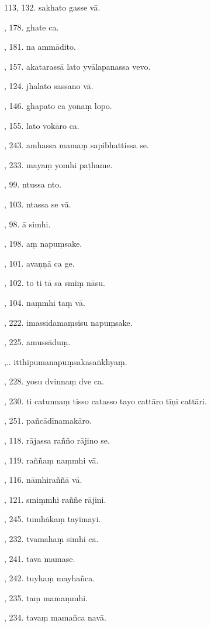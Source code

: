 113, 132. sakhato gasse vā.\par {}, 178. ghate ca.\par {}, 181. na ammādito.\par {}, 157. akatarassā lato yvālapanassa vevo.\par {}, 124. jhalato sassano vā.\par {}, 146. ghapato ca yonaṃ lopo.\par {}, 155. lato vokāro ca.\par {}, 243. amhassa mamaṃ sapibhattissa se.\par {}, 233. mayaṃ yomhi paṭhame.\par {}, 99. ntussa nto.\par {}, 103. ntassa se vā.\par {}, 98. ā simhi.\par {}, 198. aṃ napuṃsake.\par {}, 101. avaṇṇā ca ge.\par {}, 102. to ti tā sa smiṃ nāsu.\par {}, 104. naṃmhi taṃ vā.\par {}, 222. imassidamaṃsisu napuṃsake.\par {}, 225. amussāduṃ.\par {},.. itthipumanapuṃsakasaṅkhyaṃ.\par {}, 228. yosu dvinnaṃ dve ca.\par {}, 230. ti catunnaṃ tisso catasso tayo cattāro tīṇi cattāri.\par {}, 251. pañcādīnamakāro.\par {}, 118. rājassa rañño rājino se.\par {}, 119. raññaṃ naṃmhi vā.\par {}, 116. nāmhiraññā vā.\par {}, 121. smiṃmhi raññe rājini.\par {}, 245. tumhākaṃ tayimayi.\par {}, 232. tvamahaṃ simhi ca.\par {}, 241. tava mamase.\par {}, 242. tuyhaṃ mayhañca.\par {}, 235. taṃ mamaṃmhi.\par {}, 234. tavaṃ mamañca navā.\par \noindent
